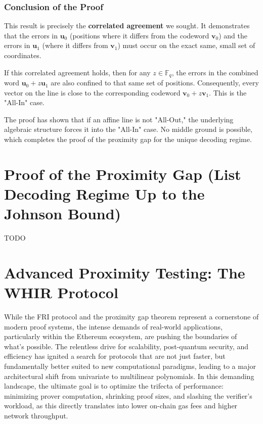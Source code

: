 \documentclass{article}
\begin{document}
\subsubsection{Conclusion of the Proof}
This result is precisely the \textbf{correlated agreement} we sought. It demonstrates that the errors in $\mathbf{u}_0$ (positions where it differs from the codeword $\mathbf{v}_0$) and the errors in $\mathbf{u}_1$ (where it differs from $\mathbf{v}_1$) must occur on the exact same, small set of coordinates.

If this correlated agreement holds, then for any $z \in \mathbb{F}_q$, the errors in the combined word $\mathbf{u}_0 + z\mathbf{u}_1$ are also confined to that same set of positions. Consequently, every vector on the line is close to the corresponding codeword $\mathbf{v}_0 + z\mathbf{v}_1$. This is the "All-In" case.

The proof has shown that if an affine line is not "All-Out," the underlying algebraic structure forces it into the "All-In" case. No middle ground is possible, which completes the proof of the proximity gap for the unique decoding regime.




\section{Proof of the Proximity Gap (List Decoding Regime Up to the Johnson Bound)}

TODO


\section{Advanced Proximity Testing: The WHIR Protocol}

While the FRI protocol and the proximity gap theorem represent a cornerstone of modern proof systems, the intense demands of real-world applications, particularly within the Ethereum ecosystem, are pushing the boundaries of what's possible. The relentless drive for scalability, post-quantum security, and efficiency has ignited a search for protocols that are not just faster, but fundamentally better suited to new computational paradigms, leading to a major architectural shift from univariate to multilinear polynomials. In this demanding landscape, the ultimate goal is to optimize the trifecta of performance: minimizing prover computation, shrinking proof sizes, and slashing the verifier's workload, as this directly translates into lower on-chain gas fees and higher network throughput.
\end{document}
